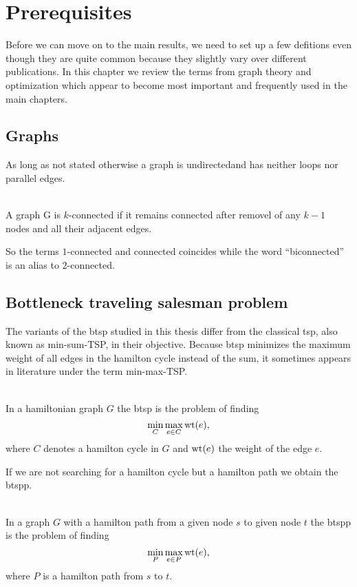 \chapter{Prerequisites}
Before we can move on to the main results, we need to set up a few defitions even though they are quite common because they slightly vary over different publications. In this chapter we review the terms from graph theory and optimization which appear to become most important and frequently used in the main chapters.

\section{Graphs}
As long as not stated otherwise a graph is undirectedand has neither loops nor parallel edges.

\begin{definition} [\(k\)-connected]\label{def:k_connected}\ \\
  A graph G is \(k\)-connected if it remains connected after removel of any \(k-1\) nodes and all their adjacent edges.
\end{definition}

So the terms \(1\)-connected and connected coincides while the word ``biconnected'' is an alias to \(2\)-connected.

\section{Bottleneck traveling salesman problem}
The variants of the \ac{btsp} studied in this thesis differ from the classical \ac{tsp}, also known as min-sum-TSP, in their objective. Because \ac{btsp} minimizes the maximum weight of all edges in the hamilton cycle instead of the sum, it sometimes appears in literature under the term min-max-TSP.

\begin{definition}\label{def:btsp}\ \\
  In a hamiltonian graph \(G\) the \ac{btsp} is the problem of finding
  \begin{equation*}
    \min\limits_{C} \max\limits_{e \in C} \textrm{wt}(e),
  \end{equation*}
  where \(C\) denotes a hamilton cycle in \(G\) and \(\textrm{wt}(e)\) the weight of the edge \(e\).
\end{definition}

If we are not searching for a hamilton cycle but a hamilton path we obtain the \ac{btspp}.

\begin{definition}\label{def:btspp}\ \\
  In a graph \(G\) with a hamilton path from a given node \(s\) to given node \(t\) the \ac{btspp} is the problem of finding
  \begin{equation*}
    \min\limits_{P} \max\limits_{e \in P} \textrm{wt}(e),
  \end{equation*}
  where \(P\) is a hamilton path from \(s\) to \(t\).
\end{definition}

